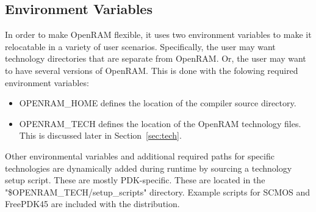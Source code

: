\subsection{Environment Variables}

In order to make OpenRAM flexible, it uses two environment variables
to make it relocatable in a variety of user scenarios. Specifically,
the user may want technology directories that are separate from
OpenRAM. Or, the user may want to have several versions of
OpenRAM. This is done with the folowing required environment
variables:
\begin{itemize}
\item OPENRAM\_HOME defines the location of the compiler source directory.
\item OPENRAM\_TECH defines the location of the OpenRAM technology
  files. This is discussed later in Section~\ref{sec:tech}.
\end{itemize}

Other environmental variables and additional required paths for
specific technologies are dynamically added during runtime by sourcing
a technology setup script. These are mostly PDK-specific. These are located in the
"\$OPENRAM\_TECH/setup\_scripts" directory. Example scripts for SCMOS and
FreePDK45 are included with the distribution. 








